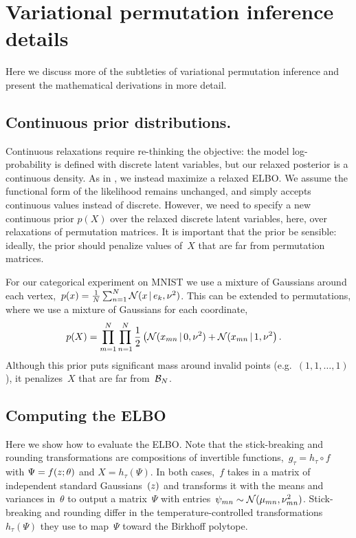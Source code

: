 \section{Variational permutation inference details}
\label{sec:details}

Here we discuss more of the subtleties of variational permutation
inference and present the mathematical derivations in more detail. 

\subsection{Continuous prior distributions.} 
Continuous relaxations require re-thinking the objective: the model
log-probability is defined with discrete latent variables, but our
relaxed posterior is a continuous density. As in
\cite{maddison2016concrete}, we instead maximize a relaxed ELBO.  We
assume the functional form of the likelihood remains unchanged, and
simply accepts continuous values instead of discrete. However, we need
to specify a new continuous prior $p(X)$ over the relaxed discrete
latent variables, here, over relaxations of permutation matrices. It
is important that the prior be sensible: ideally, the prior should
penalize values of~$X$ that are far from permutation matrices.

For our categorical experiment on MNIST we use a mixture of Gaussians
around each
vertex,~${p(x) = \tfrac{1}{N} \sum_{n=1}^N \mathcal{N}(x \, | \, e_k,
  \nu^2)}$.  This can be extended to permutations, where we use a
mixture of Gaussians for each coordinate,
\begin{align}
\label{eq:permprior}
  p(X) &= \prod_{m=1}^N \prod_{n=1}^N
  \frac{1}{2} \left(\mathcal{N}(x_{mn} \, | \, 0, \nu^2) + \mathcal{N}(x_{mn} \, | \, 1, \nu^2 \right).
\end{align}
Although this prior puts significant mass around invalid points
(e.g.~${(1, 1, \ldots, 1)}$), it penalizes~$X$ that are far from~$\mathcal{B}_N$.

\subsection{Computing the ELBO}
Here we show how to evaluate the ELBO.  Note that the stick-breaking
and rounding transformations are compositions of invertible
functions,~${g_\tau = h_\tau \circ f}$ with ${\Psi = f(z; \theta)}$ and
${X = h_\tau(\Psi)}$.  In both cases,~$f$ takes in a matrix of
independent standard Gaussians~$(z)$ and transforms it with the
means and variances in~$\theta$ to output a matrix~$\Psi$ with
entries~${\psi_{mn} \sim \mathcal{N}(\mu_{mn}, \nu^2_{mn})}$.
Stick-breaking and rounding differ in the temperature-controlled
transformations~$h_\tau(\Psi)$ they use to map~$\Psi$ toward the
Birkhoff polytope.

